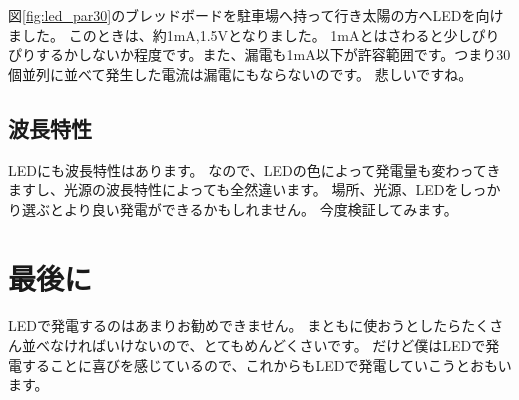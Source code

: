 図\ref{fig:led_par30}のブレッドボードを駐車場へ持って行き太陽の方へLEDを向けました。
このときは、約1\si{\milli\ampere},1.5$\si\volt$となりました。
1\si{\milli\ampere}とはさわると少しぴりぴりするかしないか程度です。また、漏電も1\si{\milli\ampere}以下が許容範囲です。つまり30個並列に並べて発生した電流は漏電にもならないのです。
悲しいですね。

\subsection{波長特性}
LEDにも波長特性はあります。
なので、LEDの色によって発電量も変わってきますし、光源の波長特性によっても全然違います。
場所、光源、LEDをしっかり選ぶとより良い発電ができるかもしれません。
今度検証してみます。

\section{最後に}
LEDで発電するのはあまりお勧めできません。
まともに使おうとしたらたくさん並べなければいけないので、とてもめんどくさいです。
だけど僕はLEDで発電することに喜びを感じているので、これからもLEDで発電していこうとおもいます。
